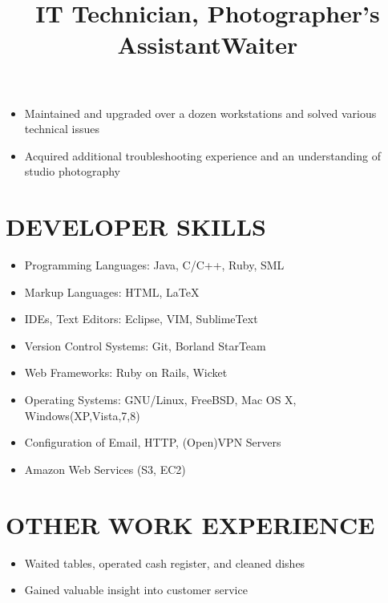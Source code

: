 \documentclass[line, overlapped]{res}
\begin{document}
\begin{resume}
    \title{IT Technician, Photographer's Assistant}
    \begin{position}
        \begin{itemize}
            \item Maintained and upgraded over a dozen workstations and solved various technical issues
            \item Acquired additional troubleshooting experience and an understanding of studio photography
        \end{itemize}
    \end{position}



	\section{DEVELOPER SKILLS}
	\begin{itemize}[leftmargin=10pt]
		\item Programming Languages:  Java, C/C++, Ruby, SML
        \item Markup Languages:  HTML, \LaTeX
        \item IDEs, Text Editors:  Eclipse, VIM, SublimeText
        \item Version Control Systems:  Git, Borland StarTeam
        \item Web Frameworks:  Ruby on Rails, Wicket
	\item Operating Systems:  GNU/Linux, FreeBSD, Mac OS X, Windows(XP,Vista,7,8)
	\item Configuration of Email, HTTP, (Open)VPN Servers
        \item Amazon Web Services (S3, EC2)
	\end{itemize}
	
	\section{OTHER WORK EXPERIENCE}
	
    \title{Waiter}
    \begin{position}
        \begin{itemize}
            \item Waited tables, operated cash register, and cleaned dishes
            \item Gained valuable insight into customer service
        \end{itemize}
    \end{position}


\end{resume}
\end{document}
